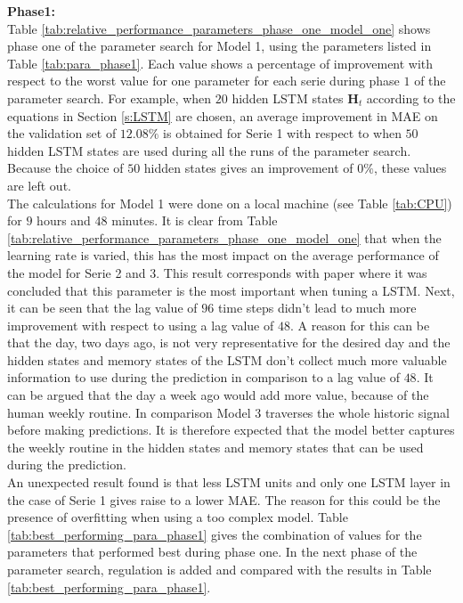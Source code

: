 \textbf{Phase1:}\\
Table \ref{tab:relative_performance_parameters_phase_one_model_one} shows phase one of the parameter search for Model 1, using the parameters listed in Table \ref{tab:para_phase1}. Each value shows a percentage of improvement with respect to the worst value for one parameter for each serie during phase $ 1 $ of the parameter search. For example, when $ 20 $ hidden LSTM states $ \bm{H}_t $ according to the equations in Section \ref{s:LSTM} are chosen, an average improvement in MAE on the validation set of $ 12.08\% $ is obtained for Serie 1 with respect to when $ 50 $ hidden LSTM states are used during all the runs of the parameter search. Because the choice of $ 50 $ hidden states gives an improvement of $ 0\% $, these values are left out.\\
The calculations for Model 1 were done on a local machine (see Table \ref{tab:CPU}) for $ 9 $ hours and $ 48 $ minutes. It is clear from Table \ref{tab:relative_performance_parameters_phase_one_model_one} that when the learning rate is varied, this has the most impact on the average performance of the model for Serie 2 and 3. This result corresponds with paper \cite{Greff2017} where it was concluded that this parameter is the most important when tuning a LSTM. Next, it can be seen that the lag value of $ 96 $ time steps didn't lead to much more improvement with respect to using a lag value of $ 48 $. A reason for this can be that the day, two days ago, is not very representative for the desired day and the hidden states and memory states of the LSTM don't collect much more valuable information to use during the prediction in comparison to a lag value of $ 48 $. It can be argued that the day a week ago would add more value, because of the human weekly routine. In comparison Model $ 3 $ traverses the whole historic signal before making predictions. It is therefore expected that the model better captures the weekly routine in the hidden states and memory states that can be used during the prediction.\\
An unexpected result found is that less LSTM units and only one LSTM layer in the case of Serie 1 gives raise to a lower MAE. The reason for this could be the presence of overfitting when using a too complex model. Table \ref{tab:best_performing_para_phase1} gives the combination of values for the parameters that performed best during phase one. In the next phase of the parameter search, regulation is added and compared with the results in Table \ref{tab:best_performing_para_phase1}.\\

